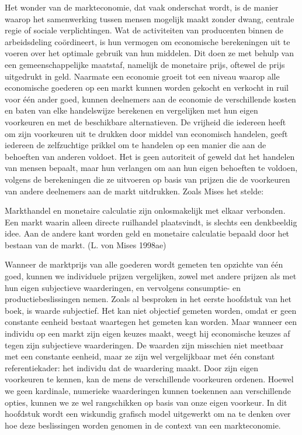 \documentclass[
  a5paper,
  smalldemyvopaper,11pt,twoside,onecolumn,openright,extrafontsizes,
hidelinks]{memoir}
\begin{document}
Het wonder van de markteconomie, dat vaak onderschat wordt, is de manier
waarop het samenwerking tussen mensen mogelijk maakt zonder dwang,
centrale regie of sociale verplichtingen. Wat de activiteiten van
producenten binnen de arbeidsdeling coördineert, is hun vermogen om
economische berekeningen uit te voeren over het optimale gebruik van hun
middelen. Dit doen ze met behulp van een gemeenschappelijke maatstaf,
namelijk de monetaire prijs, oftewel de prijs uitgedrukt in geld.
Naarmate een economie groeit tot een niveau waarop alle economische
goederen op een markt kunnen worden gekocht en verkocht in ruil voor één
ander goed, kunnen deelnemers aan de economie de verschillende kosten en
baten van elke handelswijze berekenen en vergelijken met hun eigen
voorkeuren en met de beschikbare alternatieven. De vrijheid die iedereen
heeft om zijn voorkeuren uit te drukken door middel van economisch
handelen, geeft iedereen de zelfzuchtige prikkel om te handelen op een
manier die aan de behoeften van anderen voldoet. Het is geen autoriteit
of geweld dat het handelen van mensen bepaalt, maar hun verlangen om aan
hun eigen behoeften te voldoen, volgens de berekeningen die ze uitvoeren
op basis van prijzen die de voorkeuren van andere deelnemers aan de
markt uitdrukken. Zoals Mises het stelde:

Markthandel en monetaire calculatie zijn onlosmakelijk met elkaar
verbonden. Een markt waarin alleen directe ruilhandel plaatsvindt, is
slechts een denkbeeldig idee. Aan de andere kant worden geld en
monetaire calculatie bepaald door het bestaan van de markt. (L. von
Mises 1998ae)

Wanneer de marktprijs van alle goederen wordt gemeten ten opzichte van
één goed, kunnen we individuele prijzen vergelijken, zowel met andere
prijzen als met hun eigen subjectieve waarderingen, en vervolgens
consumptie- en productiebeslissingen nemen. Zoals al besproken in het
eerste hoofdstuk van het boek, is waarde subjectief. Het kan niet
objectief gemeten worden, omdat er geen constante eenheid bestaat
waartegen het gemeten kan worden. Maar wanneer een individu op een markt
zijn eigen keuzes maakt, weegt hij economische keuzes af tegen zijn
subjectieve waarderingen. De waarden zijn misschien niet meetbaar met
een constante eenheid, maar ze zijn wel vergelijkbaar met één constant
referentiekader: het individu dat de waardering maakt. Door zijn eigen
voorkeuren te kennen, kan de mens de verschillende voorkeuren ordenen.
Hoewel we geen kardinale, numerieke waarderingen kunnen toekennen aan
verschillende opties, kunnen we ze wel rangschikken op basis van onze
eigen voorkeur. In dit hoofdstuk wordt een wiskundig grafisch model
uitgewerkt om na te denken over hoe deze beslissingen worden genomen in
de context van een markteconomie.
\end{document}
